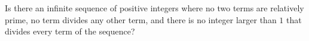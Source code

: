 Is there an infinite sequence of positive integers where no two terms are relatively prime, no term divides any other term, and there is no integer larger than $1$ that divides every term of the sequence?
